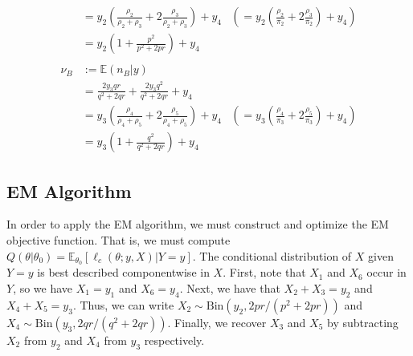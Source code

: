 \documentclass[11pt, oneside]{article}   	%
\newcommand{\bE}{\mathbb{E}}
\begin{document}
\begin{appendices}
\begin{align}
        &= y_2 \left( \frac{\rho_2}{\rho_2 + \rho_3} + 2 \frac{\rho_3}{\rho_2 + \rho_3} \right) + y_4 &\left(= y_2 \left( \frac{\rho_2}{\pi_2} + 2\frac{\rho_3}{\pi_2} \right) + y_4 \right)\\
        &= y_2 \left( 1 + \frac{p^2}{p^2 + 2pr} \right) + y_4\\
        \nonumber \\
        \nu_B &:= \bE(n_B|y)\\
        &= \frac{2 y_3 qr}{q^2 + 2qr} + \frac{2y_3 q^2}{q^2 + 2qr} + y_4\\
        &= y_3 \left( \frac{\rho_4}{\rho_4 + \rho_5} + 2\frac{\rho_5}{\rho_4 + \rho_5} \right) + y_4 &\left(= y_3 \left( \frac{\rho_4}{\pi_3} + 2\frac{\rho_5}{\pi_3} \right) + y_4 \right)\\
        &= y_3 \left( 1 + \frac{q^2}{q^2 + 2qr} \right) + y_4
    \end{align}


    \subsection{EM Algorithm}

    In order to apply the EM algorithm, we must construct and optimize the EM objective function. That is, we must compute $Q(\theta|\theta_0) = \bE_{\theta_0} \left[ \ell_c(\theta; y, X) | Y=y \right]$. The conditional distribution of $X$ given $Y=y$ is best described componentwise in $X$. First, note that $X_1$ and $X_6$ occur in $Y$, so we have $X_1 = y_1$ and $X_6 = y_4$. Next, we have that $X_2 + X_3 = y_2$ and $X_4 + X_5 = y_3$. Thus, we can write $X_2 \sim \mathrm{Bin}(y_2, 2pr / (p^2 + 2pr))$ and $X_4 \sim \mathrm{Bin}(y_3, 2qr / (q^2 + 2qr))$. Finally, we recover $X_3$ and $X_5$ by subtracting $X_2$ from $y_2$ and $X_4$ from $y_3$ respectively.
    

\end{appendices}
\end{document}
